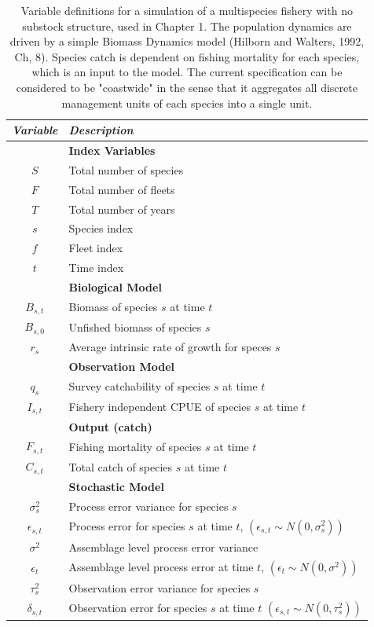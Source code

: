 \documentclass[]{scrartcl}
\begin{document}
\begin{table}[htbp]
\begin{center}
\caption{Variable definitions for a simulation of a multispecies fishery with no substock structure, used in Chapter 1. The population dynamics are driven by a simple Biomass Dynamics model (Hilborn and Walters, 1992, Ch, 8). Species catch is dependent on fishing mortality for each species, which is an input to the model. The current specification can be considered to be "coastwide" in the sense that it aggregates all discrete management units of each species into a single unit.}\label{tab:OMspec}
\begin{tabular}{c|l}
\textit{Variable} & \textit{Description}  \\
\hline
& \textbf{ Index Variables} \\
\hline
$S$ & Total number of species \\
$F$ & Total number of fleets \\
$T$ & Total number of years \\
$s$ & Species index \\
$f$ & Fleet index \\
$t$ & Time index \\
\hline
& \textbf{ Biological Model} \\
\hline
$B_{s,t}$ & Biomass of species $s$ at time $t$ \\
$B_{s,0}$ & Unfished biomass of species $s$ \\
$r_{s}$ & Average intrinsic rate of growth for speces $s$ \\
\hline
& \textbf{ Observation Model} \\
\hline
$q_{s}$ & Survey catchability of species $s$ at time $t$ \\
$I_{s,t}$ & Fishery independent CPUE of species $s$ at time $t$ \\
\hline
& \textbf{ Output (catch) } \\
\hline
$F_{s,t}$ & Fishing mortality of species $s$ at time $t$ \\
$C_{s,t}$ & Total catch of species $s$ at time $t$ \\
\hline
& \textbf{ Stochastic Model} \\
$\sigma_s^2$ & Process error variance for species $s$ \\
$\epsilon_{s,t}$ & Process error for species $s$ at time $t$, $\left( \epsilon_{s,t} \sim N (0, \sigma_s^2) \right)$ \\
$\sigma^2$ & Assemblage level process error variance \\
$\epsilon_{t}$ & Assemblage level process error at time $t$, $\left( \epsilon_{t} \sim N (0, \sigma^2) \right)$ \\
$\tau_s^2$ & Observation error variance for species $s$ \\
$\delta_{s,t}$ & Observation error for species $s$ at time $t$ $\left(\epsilon_{s,t} \sim N (0, \tau_s^2) \right)$ \\
\hline
\end{tabular}
\end{center}
\end{table}
\end{document}
